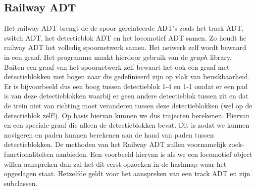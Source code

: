 \documentclass{article}
\begin{document}
\subsection{Railway ADT}
Het railway ADT brengt de de spoor gerelateerde ADT's zoals het track ADT, switch ADT, het detectieblok ADT en het locomotief ADT samen. 
Zo houdt he railway ADT het volledig spoornetwerk samen. Het netwerk zelf wordt bewaard in een graaf. Het programma maakt hierdoor gebruik van de $graph$ library. 
Buiten een graaf van het spoornetwerk zelf bewaart het ook een graaf met detectieblokken met bogen naar die gedefinieerd zijn op vlak van bereikbaarheid. Er is bijvoorbeeld dus een boog tussen
detectieblok 1-4 en 1-1 omdat er een pad is van deze detectieblokken waarbij er geen andere detectieblok tussen zit en dat de trein niet van richting moet veranderen tussen deze detectieblokken (wel op de detectieblok zelf!). Op basis hiervan kunnen we dus trajecten berekenen. Hiervan en een speciale graaf die alleen de detectieblokken bevat. Dit is zodat we kunnen
navigeren en paden kunnen berekenen aan de hand van paden tussen detectieblokken. De methoden van het Railway ADT zullen voornamelijk zoek-functionaliteiten aanbieden. 
Een voorbeeld hiervan is als we een locomotief object willen aanspreken dan zal het dit eerst opzoeken in de hashmap waar het opgeslagen staat. Hetzelfde geldt voor het 
aanspreken van een track ADT en zijn subclassen. 
\end{document}

